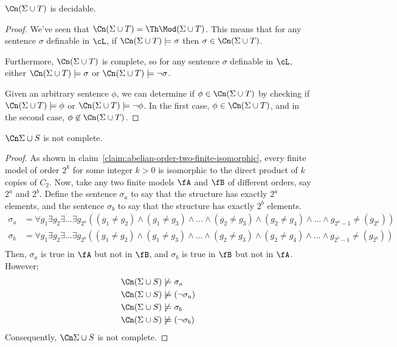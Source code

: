 \begin{corollary}
  $\Cn (\Sigma \cup T)$ is decidable.

  \begin{proof}
    We've seen that $\Cn (\Sigma \cup T) = \Th \Mod (\Sigma \cup T)$.
    This means that for any sentence $\sigma$ definable in $\cL$,
    if $\Cn (\Sigma \cup T) \models \sigma$ then 
    $\sigma \in \Cn (\Sigma \cup T)$.
    
    Furthermore, $\Cn (\Sigma \cup T)$ is complete,
    so for any sentence $\sigma$ definable in $\cL$,
    either $\Cn (\Sigma \cup T) \models \sigma$ or
    $\Cn (\Sigma \cup T) \models \neg \sigma$.

    Given an arbitrary sentence $\phi$, we can determine if $\phi \in \Cn (\Sigma \cup T)$
    by checking if $\Cn (\Sigma \cup T) \models \phi$ or $\Cn (\Sigma \cup T) \models \neg \phi$.
    In the first case, $\phi \in \Cn (\Sigma \cup T)$, and in the second case,
    $\phi \notin \Cn (\Sigma \cup T)$.
  \end{proof}
\end{corollary}

\newpage
\begin{claim}
  $\Cn \Sigma \cup S$ is not complete.

  \begin{proof}
    As shown in claim~\ref{claim:abelian-order-two-finite-isomorphic},
    every finite model of order $2^k$ for some integer $k > 0$ is isomorphic to
    the direct product of $k$ copies of $C_2$.
    Now, take any two finite models $\fA$ and $\fB$ of different orders, say $2^a$ and $2^b$.
    Define the sentence $\sigma_a$ to say that the structure has exactly $2^a$ elements,
    and the sentence $\sigma_b$ to say that the structure has exactly $2^b$ elements.
    \begin{align*}
      \sigma_a &= \forall g_1 \exists g_2 \exists \ldots \exists g_{2^a}
      ((g_1 \neq g_2) \land (g_1 \neq g_3) \land \ldots \land (g_2 \neq g_3) \land(g_2 \neq g_4) \land \ldots \land g_{2^a-1} \neq (g_{2^a})) \\
      \sigma_b &= \forall g_1 \exists g_2 \exists \ldots \exists g_{2^b}
      ((g_1 \neq g_2) \land (g_1 \neq g_3) \land \ldots \land (g_2 \neq g_3) \land(g_2 \neq g_4) \land \ldots \land g_{2^b-1} \neq (g_{2^b})) \\
    \end{align*}
    Then, $\sigma_a$ is true in $\fA$ but not in $\fB$, and $\sigma_b$ is true in $\fB$ but not in $\fA$.
    However;
    \begin{align*}
      \Cn (\Sigma \cup S) &\not\models \sigma_a \\
      \Cn (\Sigma \cup S) &\not\models (\neg \sigma_a) \\
      \Cn (\Sigma \cup S) &\not\models \sigma_b \\
      \Cn (\Sigma \cup S) &\not\models (\neg \sigma_b)
    \end{align*}
    Consequently, $\Cn \Sigma \cup S$ is not complete.
  \end{proof}
\end{claim}

